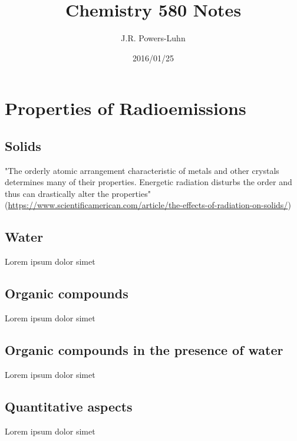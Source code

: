 \documentclass{article}
\author{J.R. Powers-Luhn}
\date{2016/01/25}
\title{Chemistry 580 Notes}
\begin{document}
\setcounter{section}{2}

\section{Properties of Radioemissions}

\setcounter{subsection}{13}

\subsection{Solids}

"The orderly atomic arrangement characteristic of metals and other crystals determines many of their properties. Energetic radiation disturbs the order and thus can drastically alter the properties" (\url{https://www.scientificamerican.com/article/the-effects-of-radiation-on-solids/})

\subsection{Water}

Lorem ipsum dolor simet

\subsection{Organic compounds}

Lorem ipsum dolor simet

\subsection{Organic compounds in the presence of water}

Lorem ipsum dolor simet

\subsection{Quantitative aspects}

Lorem ipsum dolor simet
\end{document}
